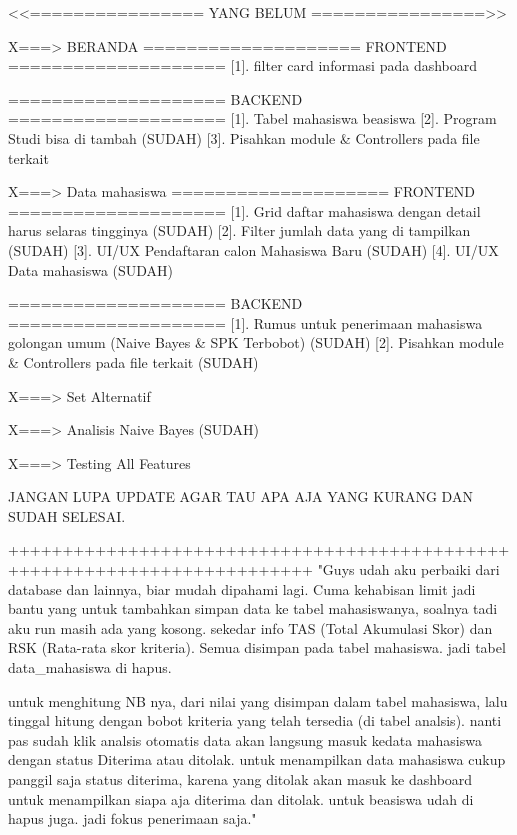 <<================ YANG BELUM ================>>

X===> BERANDA
    ==================== FRONTEND ====================
    [1]. filter card informasi pada dashboard

    ==================== BACKEND ====================
    [1]. Tabel mahasiswa beasiswa
    [2]. Program Studi bisa di tambah (SUDAH)
    [3]. Pisahkan module & Controllers pada file terkait
    
X===> Data mahasiswa
    ==================== FRONTEND ====================
    [1]. Grid daftar mahasiswa dengan detail harus selaras tingginya (SUDAH)
    [2]. Filter jumlah data yang di tampilkan (SUDAH)
    [3]. UI/UX Pendaftaran calon Mahasiswa Baru (SUDAH)
    [4]. UI/UX Data mahasiswa (SUDAH)
    
    ==================== BACKEND ====================
    [1]. Rumus untuk penerimaan mahasiswa golongan umum (Naive Bayes & SPK Terbobot) (SUDAH)
    [2]. Pisahkan module & Controllers pada file terkait (SUDAH)

X===> Set Alternatif

X===> Analisis Naive Bayes (SUDAH)

X===> Testing All Features

JANGAN LUPA UPDATE AGAR TAU APA AJA YANG KURANG DAN SUDAH SELESAI.



++++++++++++++++++++++++++++++++++++++++++++++++++++++++++++++++++++++++++
"Guys udah aku perbaiki dari database dan lainnya, biar mudah dipahami lagi. Cuma kehabisan limit
jadi bantu yang untuk tambahkan simpan data ke tabel mahasiswanya, soalnya tadi aku run masih ada yang kosong.
sekedar info TAS (Total Akumulasi Skor) dan RSK (Rata-rata skor kriteria). Semua disimpan pada tabel mahasiswa.
jadi tabel data_mahasiswa di hapus. 

untuk menghitung NB nya, dari nilai yang disimpan dalam tabel mahasiswa, lalu tinggal hitung dengan bobot
kriteria yang telah tersedia (di tabel analsis). nanti pas sudah klik analsis otomatis data akan langsung
masuk kedata mahasiswa dengan status Diterima atau ditolak. untuk menampilkan data mahasiswa cukup panggil
saja status diterima, karena yang ditolak akan masuk ke dashboard untuk menampilkan siapa aja diterima
dan ditolak. untuk beasiswa udah di hapus juga. jadi fokus penerimaan saja."